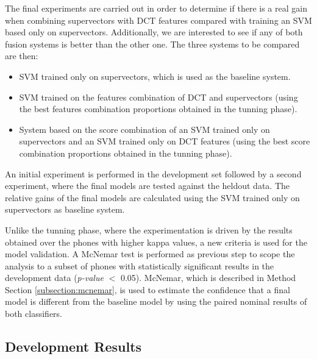 The final experiments are carried out in order
to determine if there is a real gain when combining
supervectors with DCT features compared with training an SVM based only on supervectors.
Additionally, we are interested to see if any of both fusion systems is better
than the other one. The three systems to be compared are then:

\begin{itemize}
	\item SVM trained only on supervectors, which is used as the baseline system.
	\item SVM trained on the features combination of DCT and supervectors (using the best features combination proportions obtained in the tunning phase).
	\item System based on the score combination of an SVM trained
	only on supervectors and an SVM trained
	only on DCT features (using the best score combination proportions obtained in the tunning phase).
\end{itemize}

An initial experiment is performed in the development set
followed by a second experiment, where
the final models are tested against the heldout data.
The relative gains of the final models
are calculated using the SVM trained only on supervectors as baseline system.


Unlike the tunning phase, where the experimentation is driven by the results obtained
over the phones with higher kappa values, a new criteria is used for the model validation.
A McNemar test is performed as previous step to scope the analysis
to a subset of phones with statistically significant results in the development
data (\textit{p-value} $<$ 0.05).
McNemar, which is described in Method Section \ref{subsection:mcnemar},
is used to estimate the confidence that a final model is different from
the baseline model by using the paired nominal results of both classifiers.


\subsection{Development Results}

